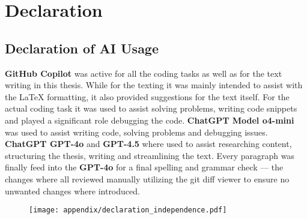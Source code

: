 


\section{Declaration}
\label{declaration}

\subsection{Declaration of AI Usage}%

\textbf{GitHub Copilot} was active for all the coding tasks as well as for the text writing in this thesis.
While for the texting it was mainly intended to assist with the LaTeX formatting, it also provided suggestions for the text itself.
For the actual coding task it was used to assist solving problems, writing code snippets and played a significant role debugging the code.
\textbf{ChatGPT Model o4-mini} was used to assist writing code, solving problems and debugging issues.
\textbf{ChatGPT GPT-4o} and \textbf{GPT-4.5} where used to assist researching content, structuring the thesis, writing and streamlining the text.
Every paragraph was finally feed into the \textbf{GPT-4o} for a final spelling and grammar check --- the changes where all reviewed manually utilizing the git diff viewer to ensure no unwanted changes where introduced.

\newpage
{}

\thispagestyle{empty}
\begin{figure}[h!]
    \centering
    \texttt{[image: appendix/declaration\_independence.pdf]}
\end{figure}
\restoregeometry %
